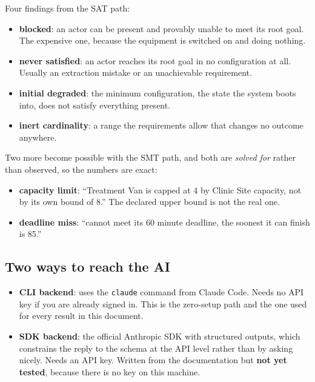 \documentclass[11pt,a4paper]{article}
\begin{document}
Four findings from the SAT path:

\begin{itemize}
\item \textbf{blocked}: an actor can be present and provably unable to meet its root
      goal. The expensive one, because the equipment is switched on and doing nothing.
\item \textbf{never satisfied}: an actor reaches its root goal in no configuration at
      all. Usually an extraction mistake or an unachievable requirement.
\item \textbf{initial degraded}: the minimum configuration, the state the system boots
      into, does not satisfy everything present.
\item \textbf{inert cardinality}: a range the requirements allow that changes no
      outcome anywhere.
\end{itemize}

Two more become possible with the SMT path, and both are \emph{solved for} rather than
observed, so the numbers are exact:

\begin{itemize}
\item \textbf{capacity limit}: ``Treatment Van is capped at 4 by Clinic Site capacity,
      not by its own bound of 8.'' The declared upper bound is not the real one.
\item \textbf{deadline miss}: ``cannot meet its 60 minute deadline, the soonest it can
      finish is 85.''
\end{itemize}

\subsection{Two ways to reach the AI}

\begin{itemize}
\item \textbf{CLI backend}: uses the \texttt{claude} command from Claude Code. Needs no
      API key if you are already signed in. This is the zero-setup path and the one used
      for every result in this document.
\item \textbf{SDK backend}: the official Anthropic SDK with structured outputs, which
      constrains the reply to the schema at the API level rather than by asking nicely.
      Needs an API key. Written from the documentation but \textbf{not yet tested},
      because there is no key on this machine.
\end{itemize}
\end{document}
